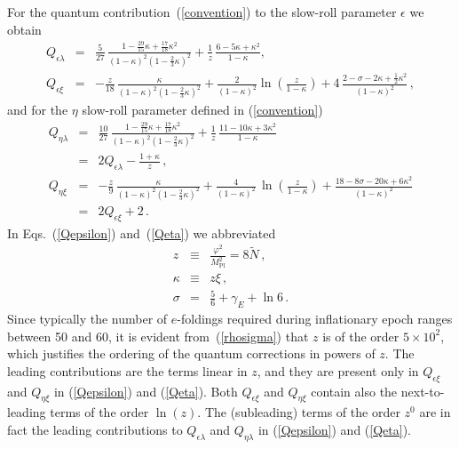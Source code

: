 \documentclass[aps,12pt,superscriptaddress,preprintnumbers,
                secnumarabic,nofootinbib,showpacs]{revtex4}
\begin{document}
 For the quantum contribution~(\ref{convention}) to the slow-roll parameter
$\epsilon$ we obtain
\begin{eqnarray}
Q_{\epsilon\lambda} &=& \frac{5}{27}\,\frac{1-\frac{29}{15}\kappa
+ \frac{17}{18}\kappa^2}{(1-\kappa)^2(1-\frac{2}{3}\kappa)^2} +
\frac{1}{z}\,\frac{6-5\kappa
+\kappa^2}{1-\kappa},\nonumber\\
Q_{\epsilon\xi} &=&
-\frac{z}{18}\,\frac{\kappa}{(1-\kappa)^2(1-\frac{2}{3}\kappa)^2}
+ \frac{2}{(1-\kappa)^2}\ln\left(\frac{z}{1-\kappa}\right)
+ 4\,\frac{2-\sigma-2\kappa +
\frac{1}{2}\kappa^2}{(1-\kappa)^2}
\,,
\label{Qepsilon}
\end{eqnarray}
and for the $\eta$ slow-roll parameter defined in
(\ref{convention})
\begin{eqnarray}
Q_{\eta\lambda} &=& \frac{10}{27}\,\frac{1-\frac{29}{15}\kappa
+\frac{17}{18}\kappa^2}{(1-\kappa)^2(1-\frac{2}{3}\kappa)^2}+\frac{1}{z}\,\frac{11-10\kappa +3\kappa^2}{1-\kappa}\nonumber\\
&=&2 Q_{\epsilon\lambda}-\frac{1+\kappa}{z}\nonumber\,,
\label{Qeta}
\\
Q_{\eta\xi} &=&
-\frac{z}{9}\,\frac{\kappa}{(1-\kappa)^2(1-\frac{2}{3}\kappa)^2} + \frac{4}{(1-\kappa)^2}\,\ln\left(\frac{z}{1-\kappa}\right) + \frac{18-8\sigma-20\kappa +6\kappa^2}{(1-\kappa)^2}\nonumber\\
&=& 2 Q_{\epsilon\xi} + 2
\,.
\end{eqnarray}
In Eqs.~(\ref{Qepsilon}) and~(\ref{Qeta}) we abbreviated
\begin{eqnarray}
z &\equiv& \frac{\varphi^2}{M^2_{\mathrm{Pl}}} =
8\tilde{N}\,,\nonumber\\
\kappa &\equiv& z\xi \,,
\nonumber\\
\sigma 
      &=& \frac56 +\gamma_E + \ln 6
\,.
\label{rhosigma}
\end{eqnarray}
Since typically the number of $e$-foldings required during
inflationary epoch ranges between 50 and 60, it is evident
from~(\ref{rhosigma}) that $z$ is of the order $5\times 10^2$, which
justifies the ordering of the quantum corrections in powers of $z$.
The leading contributions are the terms linear in $z$, and they
are present only in $Q_{\epsilon\xi}$ and $Q_{\eta\xi}$ in (\ref{Qepsilon})
and (\ref{Qeta}). Both $Q_{\epsilon\xi}$ and $Q_{\eta\xi}$
contain also the next-to-leading terms of the order $\ln(z)$.
The (subleading) terms of the order $z^0$ are in fact the leading
contributions to $Q_{\epsilon\lambda}$ and
$Q_{\eta\lambda}$ in (\ref{Qepsilon}) and (\ref{Qeta}).
\end{document}
